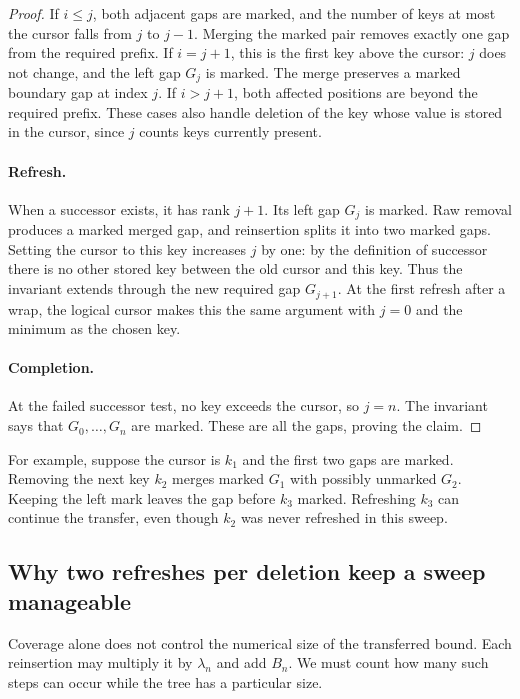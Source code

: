 \documentclass[11pt,a4paper]{article}
\theoremstyle{readable}
\begin{document}
\begin{proof}
If $i\le j$, both adjacent gaps are marked, and the number of keys
at most the cursor falls from $j$ to $j-1$. Merging the marked pair
removes exactly one gap from the required prefix. If $i=j+1$, this
is the first key above the cursor: $j$ does not change, and the left
gap $G_j$ is marked. The merge preserves a marked boundary gap at
index $j$. If $i>j+1$, both affected positions are beyond the required
prefix. These cases also handle deletion of the key whose value is
stored in the cursor, since $j$ counts keys currently present.

\paragraph{Refresh.}
When a successor exists, it has rank $j+1$. Its left gap $G_j$ is
marked. Raw removal produces a marked merged gap, and reinsertion
splits it into two marked gaps. Setting the cursor to this key
increases $j$ by one: by the definition of successor there is no other
stored key between the old cursor and this key. Thus the invariant
extends through the new required gap $G_{j+1}$. At the first refresh
after a wrap, the logical cursor makes this the same argument with
$j=0$ and the minimum as the chosen key.

\paragraph{Completion.}
At the failed successor test, no key exceeds the cursor, so $j=n$.
The invariant says that $G_0,\ldots,G_n$ are marked. These are all
the gaps, proving the claim.\qedhere
\end{proof}

For example, suppose the cursor is $k_1$ and the first two gaps are
marked. Removing the next key $k_2$ merges marked $G_1$ with possibly
unmarked $G_2$. Keeping the left mark leaves the gap before $k_3$
marked. Refreshing $k_3$ can continue the transfer, even though $k_2$
was never refreshed in this sweep.

\subsection{Why two refreshes per deletion keep a sweep manageable}
\label{sec:counts}

Coverage alone does not control the numerical size of the transferred
bound. Each reinsertion may multiply it by $\lambda_n$ and add $B_n$.
We must count how many such steps can occur while the tree has a
particular size.
\end{document}
